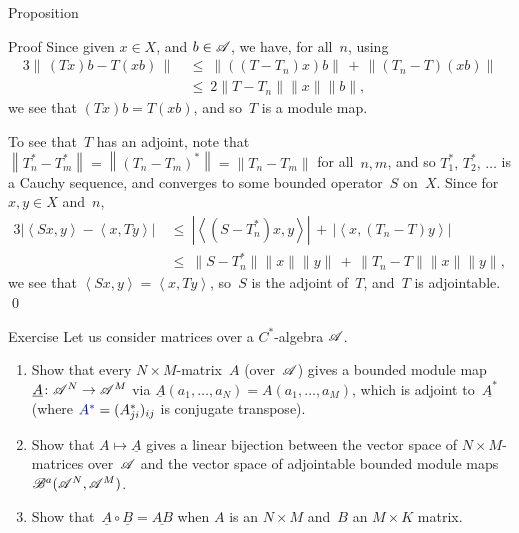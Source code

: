 \documentclass[a]{subfiles}
\begin{document}
\begin{parsec}
\begin{point}{Proposition}
\begin{point}{Proof}
Since given $x\in X$, and $b\in\mathscr{A}$, we have, for all~$n$,
using~
\begin{alignat*}{3}
\left\|\,(Tx)b-T(xb)\,\right\|
\ &\leq\ \left\|((T-T_n)x)b\right\|
\,+\,\left\|(T_n-T)(xb)\right\|
\\
&\leq\ 
2\|T-T_n\|\|x\|\|b\|,
\end{alignat*}
we see that $(Tx)b=T(xb)$, and so~$T$ is a module map.

To see that~$T$ has an adjoint,
note that~$\left\|T_n^*-T_m^*\right\|
=\left\|(T_n-T_m)^*\right\|
=\left\|T_n-T_m\right\|$
for all~$n,m$, and so $T_1^*,\,T_2^*,\,\dotsc$
is a Cauchy sequence,
and converges to some bounded operator~$S$ on~$X$.
Since for~$x,y\in X$ and~$n$,
\begin{alignat*}{3}
\left|\left<Sx,y\right>-\left<x,Ty\right>\right|
\ &\leq\ 
\left|\left<(S-T^*_n)x,y\right>\right|
\,+\,
\left|\left<x,(T_n-T)y\right>\right|
\\
\ &\leq\ 
\|S-T^*_n\|\|x\|\|y\|\,+\,\|T_n-T\|\|x\|\|y\|,
\end{alignat*}
we see that $\left<Sx,y\right>=\left<x,Ty\right>$,
so~$S$ is the adjoint of~$T$,
and~$T$ is adjointable.
\qed
\end{point}
\end{point}
\begin{point}{Exercise}%
Let us consider matrices over a $C^*$-algebra $\mathscr{A}$.
\begin{enumerate}
\item
	Show that every $N\times M$-matrix~$A$ (over~$\mathscr{A}$)
gives a bounded module map~$\underline{A}\colon \mathscr{A}^N\to\mathscr{A}^M$ 
via $\underline{A}(a_1,\dotsc,a_N)= A(a_1,\dotsc,a_M)$,
which is adjoint to~$\underline{A^*}$
(where $\Define{A^*}= (A_{ji}^*)_{ij}$ is conjugate transpose).

\item
Show that $A\mapsto \underline{A}$
gives a linear bijection between the vector 
space of $N\times M$-matrices 
over~$\mathscr{A}$ and the vector space of adjointable bounded
module maps~$\mathscr{B}^a(\mathscr{A}^N,\mathscr{A}^M)$.

\item
Show that~$\underline{A}\circ \underline{B} = \underline{AB}$
when $A$ is an $N\times M$ and~$B$ an $M\times K$ matrix.


\end{enumerate}
\end{point}
\end{parsec}
\end{document}
